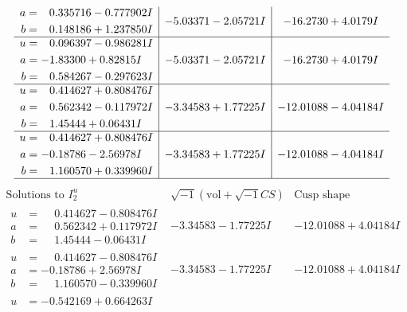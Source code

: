 \documentclass[1p]{elsarticle_modified}
\theoremstyle{definition}
\newcommand{\I}{\sqrt{-1}}
\begin{document}
$$\begin{array}{c|c|c}
\begin{aligned}
a &= \phantom{-}0.335716 - 0.777902 I \\
b &= \phantom{-}0.148186 + 1.237850 I\end{aligned}
 & -5.03371 - 2.05721 I & -16.2730 + 4.0179 I \\ \hline\begin{aligned}
u &= \phantom{-}0.096397 - 0.986281 I \\
a &= -1.83300 + 0.82815 I \\
b &= \phantom{-}0.584267 - 0.297623 I\end{aligned}
 & -5.03371 - 2.05721 I & -16.2730 + 4.0179 I \\ \hline\begin{aligned}
u &= \phantom{-}0.414627 + 0.808476 I \\
a &= \phantom{-}0.562342 - 0.117972 I \\
b &= \phantom{-}1.45444 + 0.06431 I\end{aligned}
 & -3.34583 + 1.77225 I & -12.01088 - 4.04184 I \\ \hline\begin{aligned}
u &= \phantom{-}0.414627 + 0.808476 I \\
a &= -0.18786 - 2.56978 I \\
b &= \phantom{-}1.160570 + 0.339960 I\end{aligned}
 & -3.34583 + 1.77225 I & -12.01088 - 4.04184 I\\
 \hline 
 \end{array}$$\newpage$$\begin{array}{c|c|c}  
\text{Solutions to }I^u_{2}& \I (\text{vol} + \sqrt{-1}CS) & \text{Cusp shape}\\
 \hline 
\begin{aligned}
u &= \phantom{-}0.414627 - 0.808476 I \\
a &= \phantom{-}0.562342 + 0.117972 I \\
b &= \phantom{-}1.45444 - 0.06431 I\end{aligned}
 & -3.34583 - 1.77225 I & -12.01088 + 4.04184 I \\ \hline\begin{aligned}
u &= \phantom{-}0.414627 - 0.808476 I \\
a &= -0.18786 + 2.56978 I \\
b &= \phantom{-}1.160570 - 0.339960 I\end{aligned}
 & -3.34583 - 1.77225 I & -12.01088 + 4.04184 I \\ \hline\begin{aligned}
u &= -0.542169 + 0.664263 I \\

\end{aligned}
\end{array}$$
\end{document}
